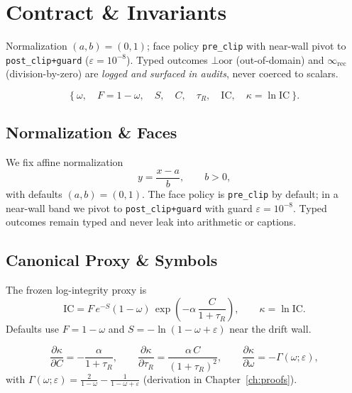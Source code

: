 \chapter{Contract \& Invariants}
\label{ch:contract}

\begin{callout}
Normalization $(a,b)=(0,1)$; face policy \texttt{pre\_clip} with near-wall pivot to \texttt{post\_clip+guard} ($\varepsilon=10^{-8}$). Typed outcomes $\bot\!\mathrm{oor}$ (out-of-domain) and $\infty_{\mathrm{rec}}$ (division-by-zero) are \emph{logged and surfaced in audits}, never coerced to scalars.
\end{callout}

\begin{eqbox}
\[
\bigl\{\ \omega,\quad F=1-\omega,\quad S,\quad C,\quad \tau_{R},\quad \mathrm{IC},\quad \kappa=\ln\mathrm{IC}\ \bigr\}.
\]
\end{eqbox}

\section{Normalization \& Faces}
\label{sec:contract-normalization}
We fix affine normalization
\[
y=\frac{x-a}{b},\qquad b>0,
\]
with defaults $(a,b)=(0,1)$. The face policy is \texttt{pre\_clip} by default; in a near-wall band we pivot to \texttt{post\_clip+guard} with guard $\varepsilon=10^{-8}$. Typed outcomes remain typed and never leak into arithmetic or captions.

\section{Canonical Proxy \& Symbols}
\label{sec:contract-canonical}
The frozen log-integrity proxy is
\[
\mathrm{IC}=F\,e^{-S}(1-\omega)\,\exp\!\left(-\alpha\,\frac{C}{1+\tau_{R}}\right),
\qquad
\kappa=\ln\mathrm{IC}.
\]
Defaults use $F=1-\omega$ and $S=-\ln(1-\omega+\varepsilon)$ near the drift wall.

\begin{eqbox}
\[
\frac{\partial \kappa}{\partial C}=-\frac{\alpha}{1+\tau_{R}},\qquad
\frac{\partial \kappa}{\partial \tau_{R}}=\frac{\alpha\,C}{(1+\tau_{R})^{2}},\qquad
\frac{\partial \kappa}{\partial \omega}= -\Gamma(\omega;\varepsilon),
\]
with $\Gamma(\omega;\varepsilon)=\tfrac{2}{1-\omega}-\tfrac{1}{1-\omega+\varepsilon}$ (derivation in Chapter~\ref{ch:proofs}).
\end{eqbox}

